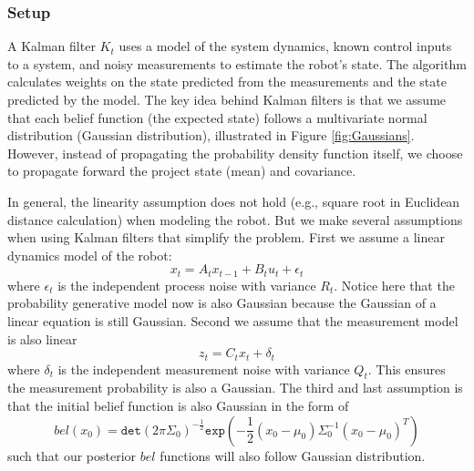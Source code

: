 \documentclass[twoside]{article}
\begin{document}
\subsubsection{Setup}
A Kalman filter $K_t$ uses a model of the system dynamics, known control inputs to a system, and noisy measurements to estimate the robot's state. The algorithm calculates weights on the state predicted from the measurements and the state predicted by the model. The key idea behind Kalman filters is that we assume that each belief function (the expected state) follows a multivariate normal distribution (Gaussian distribution), illustrated in Figure \ref{fig:Gaussians}. However, instead of propagating the probability density function itself, we choose to propagate forward the project state (mean) and covariance.

\par
In general, the linearity assumption does not hold (e.g., square root in Euclidean distance calculation) when modeling the robot. But we make several assumptions when using Kalman filters that simplify the problem.
First we assume a linear dynamics model of the robot:
\begin{equation}
x_t = A_t x_{t-1} + B_t u_t + \epsilon_{t}
\end{equation}
where $\epsilon_{t}$ is the independent process noise with variance $R_t$. Notice here that the probability generative model now is also Gaussian because the Gaussian of a linear equation is still Gaussian. Second we assume that the measurement model is also linear
\begin{equation}
z_t = C_t x_t + \delta_t
\end{equation}
where $\delta_t$ is the independent measurement noise with variance $Q_t$. This ensures the measurement probability is also a Gaussian. The third and last assumption is that the initial belief function is also Gaussian in the form of \begin{equation}
bel(x_0) = \mathtt{det}(2\pi\Sigma_0)^{-\frac{1}{2}}\mathtt{exp}(-\frac{1}{2}(x_0-\mu_0)\Sigma_0^{-1}(x_0-\mu_0)^{T})
\end{equation}
such that our posterior $bel$ functions will also follow Gaussian distribution.
\end{document}
